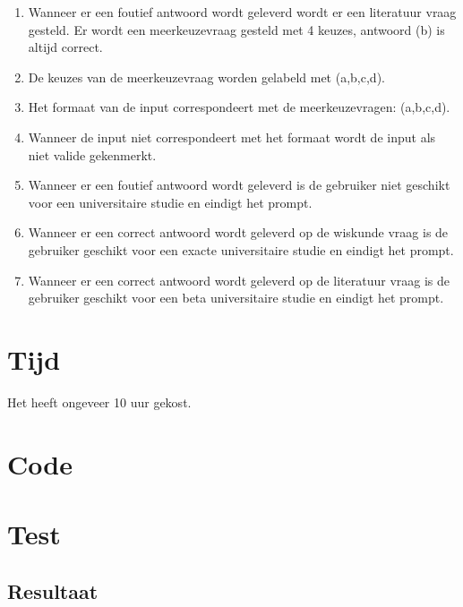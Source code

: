 \documentclass[10pt]{article}
\begin{document}
\begin{enumerate}
  \item Wanneer er een foutief antwoord wordt geleverd wordt er een literatuur vraag gesteld. Er wordt een
        meerkeuzevraag gesteld met 4 keuzes, antwoord (b) is altijd correct.
  \item De keuzes van de meerkeuzevraag worden gelabeld met (a,b,c,d).
  \item Het formaat van de input correspondeert met de meerkeuzevragen: (a,b,c,d).
  \item Wanneer de input niet correspondeert met het formaat wordt de input als niet valide gekenmerkt.
  \item Wanneer er een foutief antwoord wordt geleverd is de gebruiker niet geschikt voor een universitaire studie en
        eindigt het prompt.
  \item Wanneer er een correct antwoord wordt geleverd op de wiskunde vraag is de gebruiker geschikt voor een exacte
        universitaire studie en eindigt het prompt.
  \item Wanneer er een correct antwoord wordt geleverd op de literatuur vraag is de gebruiker geschikt voor een beta
        universitaire studie en eindigt het prompt.
\end{enumerate}

\section{Tijd}
Het heeft ongeveer 10 uur gekost.

\section{Code}\label{sec:code}


\section{Test}\label{sec:test}


\subsection{Resultaat}\label{sec:resultaat}

\end{document}
